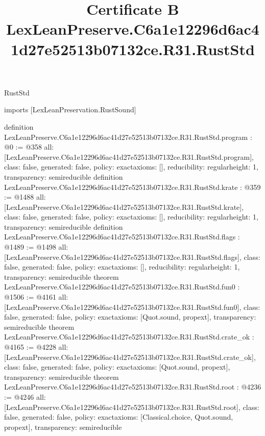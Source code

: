\begin{lexlean}{RustStd}
\title{Certificate B LexLeanPreserve.C6a1e12296d6ac41d27e52513b07132ce.R31.RustStd}
\begin{coremodule}
imports [LexLeanPreservation.RustSound]

definition LexLeanPreserve.C6a1e12296d6ac41d27e52513b07132ce.R31.RustStd.program : @0 := @358 {
  all: [LexLeanPreserve.C6a1e12296d6ac41d27e52513b07132ce.R31.RustStd.program],
  class: false,
  generated: false,
  policy: exact{axioms: []},
  reducibility: regular{height: 1},
  transparency: semireducible
}
definition LexLeanPreserve.C6a1e12296d6ac41d27e52513b07132ce.R31.RustStd.krate : @359 := @1488 {
  all: [LexLeanPreserve.C6a1e12296d6ac41d27e52513b07132ce.R31.RustStd.krate],
  class: false,
  generated: false,
  policy: exact{axioms: []},
  reducibility: regular{height: 1},
  transparency: semireducible
}
definition LexLeanPreserve.C6a1e12296d6ac41d27e52513b07132ce.R31.RustStd.flags : @1489 := @1498 {
  all: [LexLeanPreserve.C6a1e12296d6ac41d27e52513b07132ce.R31.RustStd.flags],
  class: false,
  generated: false,
  policy: exact{axioms: []},
  reducibility: regular{height: 1},
  transparency: semireducible
}
theorem LexLeanPreserve.C6a1e12296d6ac41d27e52513b07132ce.R31.RustStd.fun0 : @1506 := @4161 {
  all: [LexLeanPreserve.C6a1e12296d6ac41d27e52513b07132ce.R31.RustStd.fun0],
  class: false,
  generated: false,
  policy: exact{axioms: [Quot.sound, propext]},
  transparency: semireducible
}
theorem LexLeanPreserve.C6a1e12296d6ac41d27e52513b07132ce.R31.RustStd.crate_ok : @4165 := @4228 {
  all: [LexLeanPreserve.C6a1e12296d6ac41d27e52513b07132ce.R31.RustStd.crate_ok],
  class: false,
  generated: false,
  policy: exact{axioms: [Quot.sound, propext]},
  transparency: semireducible
}
theorem LexLeanPreserve.C6a1e12296d6ac41d27e52513b07132ce.R31.RustStd.root : @4236 := @4246 {
  all: [LexLeanPreserve.C6a1e12296d6ac41d27e52513b07132ce.R31.RustStd.root],
  class: false,
  generated: false,
  policy: exact{axioms: [Classical.choice, Quot.sound, propext]},
  transparency: semireducible
}


\end{coremodule}
\end{lexlean}

